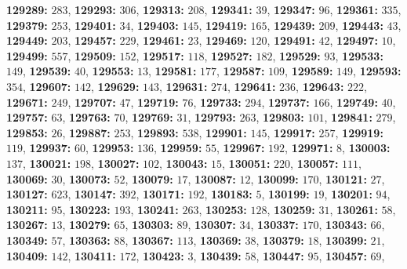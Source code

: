\textsf{\bfseries 129289:} $283$, \textsf{\bfseries 129293:} $306$, \textsf{\bfseries 129313:} $208$, \textsf{\bfseries 129341:} $39$, \textsf{\bfseries 129347:} $96$, \textsf{\bfseries 129361:} $335$, \textsf{\bfseries 129379:} $253$, \textsf{\bfseries 129401:} $34$, \textsf{\bfseries 129403:} $145$, \textsf{\bfseries 129419:} $165$, \textsf{\bfseries 129439:} $209$, \textsf{\bfseries 129443:} $43$, \textsf{\bfseries 129449:} $203$, \textsf{\bfseries 129457:} $229$, \textsf{\bfseries 129461:} $23$, \textsf{\bfseries 129469:} $120$, \textsf{\bfseries 129491:} $42$, \textsf{\bfseries 129497:} $10$, \textsf{\bfseries 129499:} $557$, \textsf{\bfseries 129509:} $152$, \textsf{\bfseries 129517:} $118$, \textsf{\bfseries 129527:} $182$, \textsf{\bfseries 129529:} $93$, \textsf{\bfseries 129533:} $149$, \textsf{\bfseries 129539:} $40$, \textsf{\bfseries 129553:} $13$, \textsf{\bfseries 129581:} $177$, \textsf{\bfseries 129587:} $109$, \textsf{\bfseries 129589:} $149$, \textsf{\bfseries 129593:} $354$, \textsf{\bfseries 129607:} $142$, \textsf{\bfseries 129629:} $143$, \textsf{\bfseries 129631:} $274$, \textsf{\bfseries 129641:} $236$, \textsf{\bfseries 129643:} $222$, \textsf{\bfseries 129671:} $249$, \textsf{\bfseries 129707:} $47$, \textsf{\bfseries 129719:} $76$, \textsf{\bfseries 129733:} $294$, \textsf{\bfseries 129737:} $166$, \textsf{\bfseries 129749:} $40$, \textsf{\bfseries 129757:} $63$, \textsf{\bfseries 129763:} $70$, \textsf{\bfseries 129769:} $31$, \textsf{\bfseries 129793:} $263$, \textsf{\bfseries 129803:} $101$, \textsf{\bfseries 129841:} $279$, \textsf{\bfseries 129853:} $26$, \textsf{\bfseries 129887:} $253$, \textsf{\bfseries 129893:} $538$, \textsf{\bfseries 129901:} $145$, \textsf{\bfseries 129917:} $257$, \textsf{\bfseries 129919:} $119$, \textsf{\bfseries 129937:} $60$, \textsf{\bfseries 129953:} $136$, \textsf{\bfseries 129959:} $55$, \textsf{\bfseries 129967:} $192$, \textsf{\bfseries 129971:} $8$, \textsf{\bfseries 130003:} $137$, \textsf{\bfseries 130021:} $198$, \textsf{\bfseries 130027:} $102$, \textsf{\bfseries 130043:} $15$, \textsf{\bfseries 130051:} $220$, \textsf{\bfseries 130057:} $111$, \textsf{\bfseries 130069:} $30$, \textsf{\bfseries 130073:} $52$, \textsf{\bfseries 130079:} $17$, \textsf{\bfseries 130087:} $12$, \textsf{\bfseries 130099:} $170$, \textsf{\bfseries 130121:} $27$, \textsf{\bfseries 130127:} $623$, \textsf{\bfseries 130147:} $392$, \textsf{\bfseries 130171:} $192$, \textsf{\bfseries 130183:} $5$, \textsf{\bfseries 130199:} $19$, \textsf{\bfseries 130201:} $94$, \textsf{\bfseries 130211:} $95$, \textsf{\bfseries 130223:} $193$, \textsf{\bfseries 130241:} $263$, \textsf{\bfseries 130253:} $128$, \textsf{\bfseries 130259:} $31$, \textsf{\bfseries 130261:} $58$, \textsf{\bfseries 130267:} $13$, \textsf{\bfseries 130279:} $65$, \textsf{\bfseries 130303:} $89$, \textsf{\bfseries 130307:} $34$, \textsf{\bfseries 130337:} $170$, \textsf{\bfseries 130343:} $66$, \textsf{\bfseries 130349:} $57$, \textsf{\bfseries 130363:} $88$, \textsf{\bfseries 130367:} $113$, \textsf{\bfseries 130369:} $38$, \textsf{\bfseries 130379:} $18$, \textsf{\bfseries 130399:} $21$, \textsf{\bfseries 130409:} $142$, \textsf{\bfseries 130411:} $172$, \textsf{\bfseries 130423:} $3$, \textsf{\bfseries 130439:} $58$, \textsf{\bfseries 130447:} $95$, \textsf{\bfseries 130457:} $69$, 

